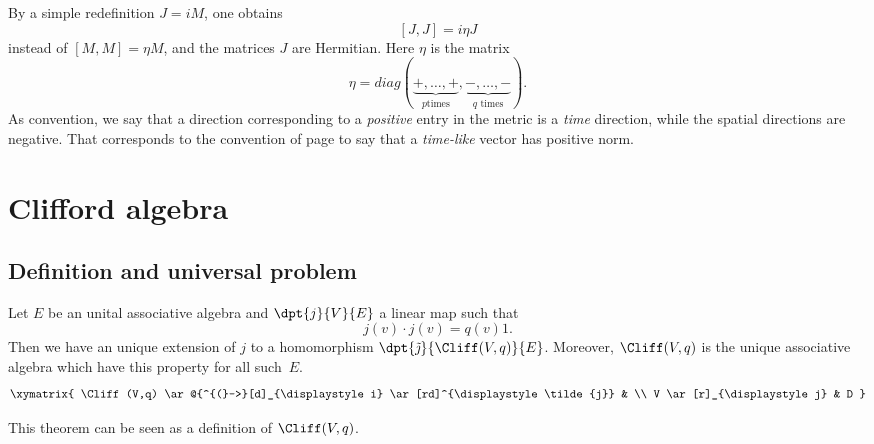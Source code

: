 By a simple redefinition $J=iM$, one obtains
\begin{equation}            \label{EqJJietaJcomm}
	[J,J]=i\eta J
\end{equation}
instead of $[M,M]=\eta M$, and the matrices $J$ are Hermitian. Here $\eta$ is the matrix
\begin{equation}
	\eta=diag(\underbrace{+,\ldots,+}_{p \text{times}},\underbrace{-,\ldots,-}_{\text{$q$ times}}).
\end{equation}
As convention, we say that a direction corresponding to a \emph{positive} entry in the metric is a \emph{time} direction, while the spatial directions are negative. That corresponds to the convention of page \pageref{PgDefsGenre} to say that a \emph{time-like} vector has positive norm.

\section{Clifford algebra}

\subsection{Definition and universal problem}


\begin{theorem}
	Let $E$ be an unital associative algebra and $\dpt{j}{V}{E}$ a linear map such that
	\begin{equation}
		j(v)\cdot j(v)=q(v)1.        \label{102r1}
	\end{equation}
	Then we have an unique extension of $j$ to a homomorphism $\dpt{\tilde\jmath}{\Cliff(V,q)}{E}$. Moreover, $\Cliff(V,q)$ is the unique associative algebra which have this property for all such~$E$.
	\[
		\xymatrix{
		\Cliff(V,q) \ar@{^{(}->}[d]_{\displaystyle i} \ar[rd]^{\displaystyle\tilde{j}} &  \\
		V \ar[r]_{\displaystyle j} & D
		}
	\]
	\label{tho_Cliffunif}
\end{theorem}
This theorem can be seen as a definition of $\Cliff(V,q)$.

